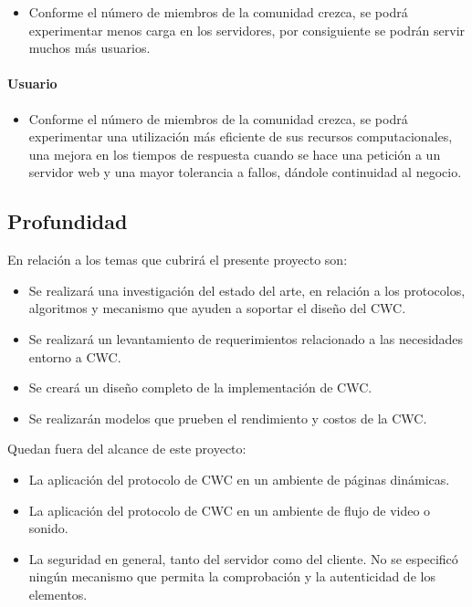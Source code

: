 \begin{itemize}
\item Conforme el número de miembros de la comunidad crezca, se podrá experimentar menos carga en los servidores, por consiguiente se podrán servir muchos más usuarios.
\end{itemize}
 

\paragraph{Usuario}
\begin{itemize}
\item Conforme el número de miembros de la comunidad crezca, se podrá experimentar una utilización más eficiente de sus recursos computacionales, una mejora en los tiempos de respuesta cuando se hace una petición a un servidor web y una mayor tolerancia a fallos, dándole continuidad al negocio. 
\end{itemize}

\subsection{Profundidad}
En relación a los temas que cubrirá el presente proyecto son:
\begin{itemize}
\item Se realizará una investigación del estado del arte, en relación a los protocolos, algoritmos y mecanismo que ayuden a soportar el diseño del CWC.
\item Se realizará un levantamiento de requerimientos relacionado a las necesidades entorno a CWC.
\item Se creará un diseño completo de la implementación de CWC.
\item Se realizarán modelos que prueben el rendimiento y costos de la CWC.
\end{itemize}

Quedan fuera del alcance de este proyecto:

\begin{itemize}
\item La aplicación del protocolo de CWC en un ambiente de páginas dinámicas.
\item La aplicación del protocolo de CWC en un ambiente de flujo de video o sonido.
\item La seguridad en general, tanto del servidor como del cliente. No se especificó ningún mecanismo que permita la comprobación y la autenticidad de los elementos.
\end{itemize}

